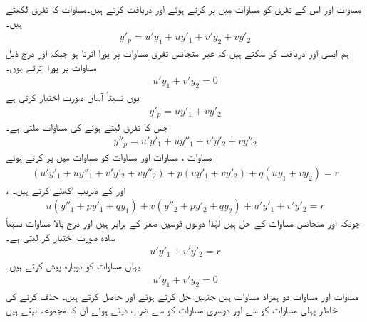 مساوات  اور اس کے تفرق کو مساوات  میں پر کرتے ہوئے  اور  دریافت کرتے ہیں۔مساوات  کا تفرق لکھتے ہیں۔
\begin{align*}
y'_p=u'y_1+uy'_1+v'y_2+vy'_2
\end{align*}
ہم ایسی  اور  دریافت کر سکتے ہیں کہ  غیر متجانس تفرق مساوات پر پورا اترتا ہو جبکہ  اور  درج ذیل مساوات پر پورا اترتے ہوں۔
\begin{align}\label{مساوات_سادہ_دو_تبدیلی_متغیرات_الف}
u'y_1+v'y_2=0
\end{align}
یوں  نسبتاً آسان صورت اختیار کرتی ہے
\begin{align}\label{مساوات_سادہ_دو_غیر_متجانس_خطی_ث}
y'_p=uy'_1+vy'_2
\end{align}
جس کا تفرق لیتے ہوئے  کی مساوات ملتی ہے۔
\begin{align}\label{مساوات_سادہ_دو_غیر_متجانس_خطی_ج}
y''_p=u'y'_1+uy''_1+v'y'_2+vy''_2
\end{align}
مساوات ، مساوات  اور مساوات  کو مساوات  میں پر کرتے  ہوئے
\begin{align*}
(u'y'_1+uy''_1+v'y'_2+vy''_2) +p(uy'_1+vy'_2)+q(uy_1+vy_2)=r
\end{align*}
، اور  کے  ضریب  اکھٹے کرتے ہیں۔
\begin{align*}
u(y''_1+py'_1+qy_1)+v(y''_2+py'_2+qy_2)+u'y'_1+v'y'_2=r
\end{align*}
چونکہ  اور  متجانس مساوات  کے حل ہیں لہٰذا دونوں قوسین صفر کے برابر ہیں اور درج بالا مساوات نسبتاً سادہ صورت اختیار کر لیتی ہے۔
\begin{align}\label{مساوات_سادہ_دو_تبدیلی_متغیرات_ب}
u'y'_1+v'y'_2=r
\end{align}
یہاں مساوات  کو دوبارہ پیش کرتے ہیں۔
\begin{align}\label{مساوات_سادہ_دو_تبدیلی_متغیرات_پ}
u'y_1+v'y_2=0
\end{align}
مساوات  اور مساوات  دو ہمزاد مساوات ہیں جنہیں حل کرتے ہوئے  اور  حاصل کرتے ہیں۔  حذف کرنے کی خاطر پہلی مساوات کو  سے اور دوسری مساوات کو  سے ضرب دیتے ہوئے ان کا مجموعہ لیتے ہیں
